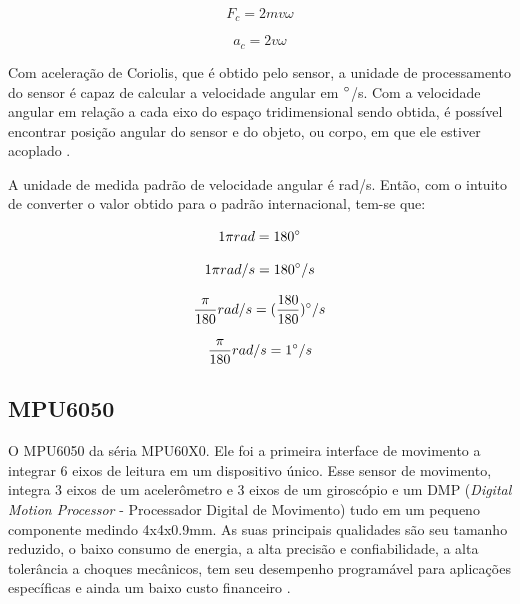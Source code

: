 			\begin{equation}
			F_{c} = 2mv\omega
			\end{equation}
			
			\begin{equation}
			a_{c} = 2v\omega
			\end{equation}
			
			Com aceleração de Coriolis, que é obtido pelo sensor, a unidade de processamento do sensor é capaz de calcular a velocidade angular em $\degree$/s. Com a velocidade angular em relação a cada eixo do espaço tridimensional sendo obtida, é possível encontrar posição angular do sensor e do objeto, ou corpo, em que ele estiver acoplado \cite{forhan2010}\cite{moyses2013}. 
			
			A unidade de medida padrão de velocidade angular  é rad/s. Então, com o intuito de converter o valor obtido para o padrão internacional, tem-se que:
			
			\begin{equation}
			1 \pi rad = 180\degree
			\end{equation}
			
			\begin{equation}
			1 \pi rad /s = 180\degree/s 
			\end{equation}
			
			\begin{equation}
			 \frac{\pi}{180} rad /s = (\frac{180}{180})\degree/s 
			\end{equation}
			
			\begin{equation}
			\frac{\pi}{180} rad /s = 1\degree/s 
			\end{equation}


\subsection{MPU6050}
	
	O MPU6050 da séria MPU60X0. Ele foi a primeira interface de movimento a integrar 6 eixos de leitura em um dispositivo único. Esse sensor de movimento, integra 3 eixos de um acelerômetro e 3 eixos de um giroscópio e um DMP (\textit{Digital Motion Processor} - Processador Digital de Movimento) tudo em um pequeno componente medindo 4x4x0.9mm. As suas principais qualidades são seu tamanho reduzido, o baixo consumo de energia, a alta precisão e confiabilidade, a alta tolerância a choques mecânicos, tem seu desempenho programável para aplicações específicas e ainda um baixo custo financeiro \cite{mpu6050}.
	
